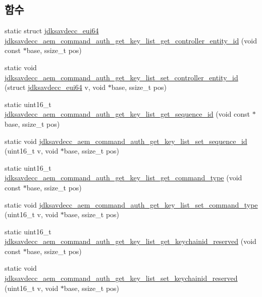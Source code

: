 \subsection*{함수}
\begin{DoxyCompactItemize}
\item 
static struct \hyperlink{structjdksavdecc__eui64}{jdksavdecc\+\_\+eui64} \hyperlink{group__command__auth__get__key__list_gaa74e213019c576b6376cb987af28f0f7}{jdksavdecc\+\_\+aem\+\_\+command\+\_\+auth\+\_\+get\+\_\+key\+\_\+list\+\_\+get\+\_\+controller\+\_\+entity\+\_\+id} (void const $\ast$base, ssize\+\_\+t pos)
\item 
static void \hyperlink{group__command__auth__get__key__list_ga708ca7be5713d94aca439a510a8b60a3}{jdksavdecc\+\_\+aem\+\_\+command\+\_\+auth\+\_\+get\+\_\+key\+\_\+list\+\_\+set\+\_\+controller\+\_\+entity\+\_\+id} (struct \hyperlink{structjdksavdecc__eui64}{jdksavdecc\+\_\+eui64} v, void $\ast$base, ssize\+\_\+t pos)
\item 
static uint16\+\_\+t \hyperlink{group__command__auth__get__key__list_gabce028c5cc844139161d4c26cb6c8b3e}{jdksavdecc\+\_\+aem\+\_\+command\+\_\+auth\+\_\+get\+\_\+key\+\_\+list\+\_\+get\+\_\+sequence\+\_\+id} (void const $\ast$base, ssize\+\_\+t pos)
\item 
static void \hyperlink{group__command__auth__get__key__list_ga01186e3c73accf7956b8371500eb9e03}{jdksavdecc\+\_\+aem\+\_\+command\+\_\+auth\+\_\+get\+\_\+key\+\_\+list\+\_\+set\+\_\+sequence\+\_\+id} (uint16\+\_\+t v, void $\ast$base, ssize\+\_\+t pos)
\item 
static uint16\+\_\+t \hyperlink{group__command__auth__get__key__list_gaf33f3ccc0087fdd40a4bdfaf62dfdc1f}{jdksavdecc\+\_\+aem\+\_\+command\+\_\+auth\+\_\+get\+\_\+key\+\_\+list\+\_\+get\+\_\+command\+\_\+type} (void const $\ast$base, ssize\+\_\+t pos)
\item 
static void \hyperlink{group__command__auth__get__key__list_ga22d516dfd6fa2ebd8de83d02471aab6d}{jdksavdecc\+\_\+aem\+\_\+command\+\_\+auth\+\_\+get\+\_\+key\+\_\+list\+\_\+set\+\_\+command\+\_\+type} (uint16\+\_\+t v, void $\ast$base, ssize\+\_\+t pos)
\item 
static uint16\+\_\+t \hyperlink{group__command__auth__get__key__list_ga1785168d7dbb84e4bdc890157584ae09}{jdksavdecc\+\_\+aem\+\_\+command\+\_\+auth\+\_\+get\+\_\+key\+\_\+list\+\_\+get\+\_\+keychainid\+\_\+reserved} (void const $\ast$base, ssize\+\_\+t pos)
\item 
static void \hyperlink{group__command__auth__get__key__list_gafca9e82b4812da3ea42a9409302af31a}{jdksavdecc\+\_\+aem\+\_\+command\+\_\+auth\+\_\+get\+\_\+key\+\_\+list\+\_\+set\+\_\+keychainid\+\_\+reserved} (uint16\+\_\+t v, void $\ast$base, ssize\+\_\+t pos)

\end{DoxyCompactItemize}
